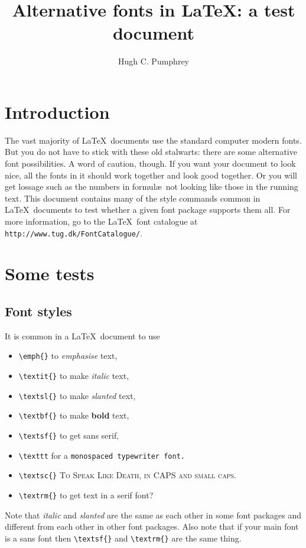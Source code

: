 \documentclass{article}
\author{Hugh C. Pumphrey}
\title{Alternative fonts in \LaTeX: a test document}
\begin{document}
\maketitle

\section{Introduction}

The vast majority of \LaTeX\ documents use the standard computer
modern fonts. But you do not have to stick with these old stalwarts:
there are some alternative font possibilities. A word of caution,
though. If you want your document to look nice, all the fonts in it
should work together and look good together. Or you will get lossage
such as the numbers in formul\ae\ not looking like those in the
running text. This document contains many of the style commands common
in \LaTeX\ documents to test whether a given font package supports
them all. For more information, go to the \LaTeX\ font catalogue at
\texttt{http://www.tug.dk/FontCatalogue/}.

\section{Some tests}
\subsection{Font styles}

It is common in a \LaTeX\ document to use 
\begin{itemize}
\item \verb+\emph{}+ to \emph{emphasise} text, 
\item \verb+\textit{}+ to make \textit{italic} text,
\item \verb+\textsl{}+ to make \textsl{slanted} text,
\item \verb+\textbf{}+ to make \textbf{bold} text,
\item \verb+\textsf{}+ to get \textsf{sans serif}, 
\item \verb+\texttt+ for a \texttt{monospaced typewriter font.} 
\item \verb+\textsc{}+ \textsc{To Speak Like
  Death, in CAPS and small caps.} 
\item  \verb+\textrm{}+ \textrm{to get text in a serif font?}
\end{itemize}
Note that \textit{italic} and \textsl{slanted} are the same as each
other in some font packages and different from each other in other
font packages. Also note that if your main font is a sans font then
\verb+\textsf{}+ and  \verb+\textrm{}+ are the same thing.
\end{document}
